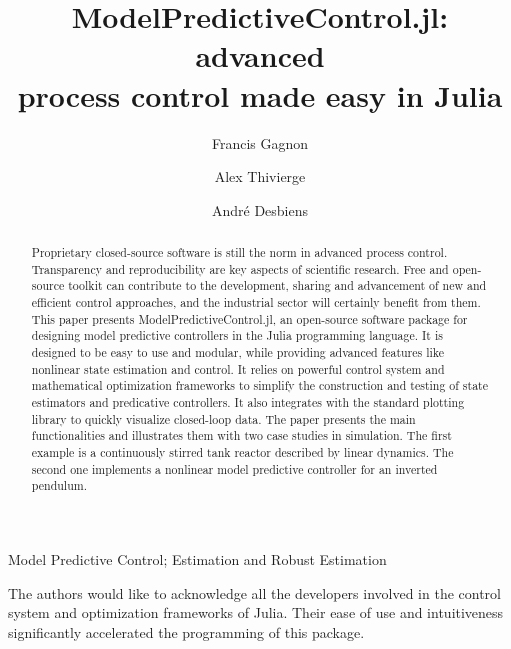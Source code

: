 \documentclass{ifacconf}
\begin{document}
\begin{frontmatter}

\title{ModelPredictiveControl.jl: advanced\\process control made easy in Julia}

\author[First]{Francis Gagnon} 
\author[First]{Alex Thivierge} 
\author[Second]{André Desbiens}

\address[First]{Jumine Inc., Quebec City, G1S 2K4, Canada}
\address[Second]{Process Observation and Optimization Laboratory (LOOP), Université Laval, Quebec City, G1V 0A6, Canada}

\begin{abstract} 
Proprietary closed-source software is still the norm in advanced process control. Transparency and reproducibility are key aspects of scientific research. Free and open-source toolkit can contribute to the development, sharing and advancement of  new and efficient control approaches, and the industrial sector will certainly benefit from them. This paper presents ModelPredictiveControl.jl, an open-source software package for designing model predictive controllers in the Julia programming language. It is designed to be easy to use and modular, while providing advanced features like nonlinear state estimation and control. It relies on powerful control system and mathematical optimization frameworks to simplify the construction and testing of state estimators and predicative controllers. It also integrates with the standard plotting library to quickly visualize closed-loop data. The paper presents the main functionalities and illustrates them with two case studies in simulation. The first example is a continuously stirred tank reactor described by linear dynamics. The second one implements a nonlinear model predictive controller for an inverted pendulum.
\end{abstract}

\begin{keyword}
Model Predictive Control; Estimation and Robust Estimation
\end{keyword}

\end{frontmatter}






\begin{ack}
The authors would like to acknowledge all the developers involved in the control system and optimization frameworks of Julia. Their ease of use and intuitiveness  significantly accelerated the programming of this package.
\end{ack}


\end{document}

